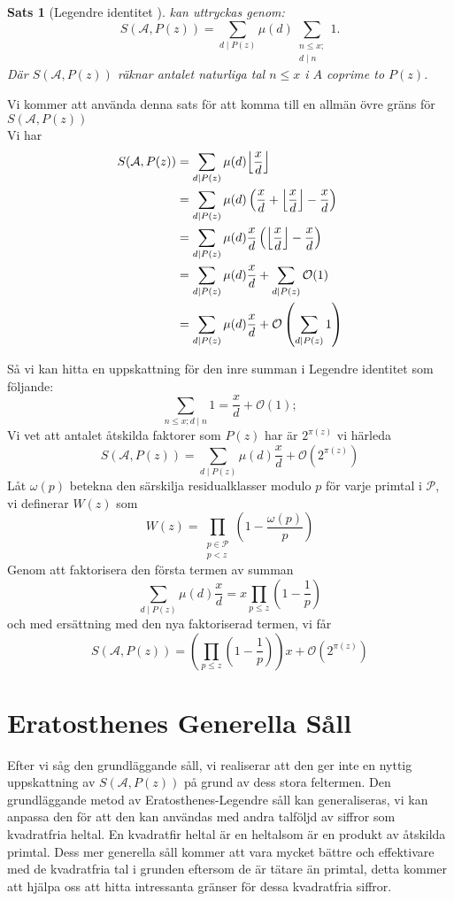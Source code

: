 \documentclass[12pt,a4paper]{article}
\newcommand{\divides}{\mid}
\newcommand{\A}{\mathcal{A}}
\renewcommand{\P}{\mathcal{P}}
\newtheorem{theorem}{Sats}[section]
\begin{document}
\begin{theorem}[Legendre identitet \cite{Terence}] kan uttryckas genom:
\[S(\A, P(z))=\sum_{d\divides P(z)}\mu(d)\sum_{\substack{n\leq x;\\d\divides n}}1. \]
Där  $ S(\A, P(z)) $ räknar antalet naturliga tal $ n\leq x $ i $ A $ coprime to $ P(z) $.
\end{theorem}
Vi kommer att använda denna sats för att komma till en allmän övre gräns för $ S(\A, P(z)) $\\
Vi har
\begin{align*}
S(\A, P(z)) & =\sum_{d\divides P(z)}\mu(d)\Bigl\lfloor \frac{x}{d}\Bigr\rfloor\\
 &  =\sum_{d\divides P(z)}\mu(d) \left( \frac{x}{d}+ \Bigl\lfloor \frac{x}{d} \Bigr\rfloor - \frac{x}{d} \right)\\
 & =\sum_{d\divides P(z)}\mu(d)\frac{x}{d} \left(\Bigl\lfloor\frac{x}{d}\Bigr\rfloor-\frac{x}{d}\right)\\
 & =\sum_{d\divides P(z)}\mu(d)\frac{x}{d}+\sum_{d\divides P(z)}\mathcal{O}(1)\\
 & =\sum_{d\divides P(z)}\mu(d)\frac{x}{d}+ \mathcal{O}\left(\sum_{d\divides P(z)}1\right)
\end{align*}

Så vi kan hitta en uppskattning för den inre summan i Legendre identitet som följande:
\[\sum_{n\leq x;d\divides n}1=\frac{x}{d}+\mathcal{O}(1); \]
Vi vet att antalet åtskilda faktorer som $ P(z) $ har är $ 2^{\pi(z)} $ vi härleda
\[S(\A, P(z))=\sum_{d\divides P(z)}\mu(d)\frac{x}{d}+ \mathcal{O}(2^{\pi(z)}) \]
Låt $ \omega(p) $ betekna den särskilja residualklasser modulo $ p $  för varje primtal i $ \P $, vi definerar $ W(z) $ som
\[W(z)=\prod_{\substack{p\in \P\\p<z}}\left( 1-\frac{\omega(p)}{p}\right)\]
Genom att faktorisera den första termen av summan 
\[\sum_{d\divides P(z)}\mu(d)\frac{x}{d}= x\prod_{p\leq z}\left( 1-\frac{1}{p} \right) \]
och med ersättning med den nya faktoriserad termen, vi får
\[S(\A, P(z))=\left( \prod_{p\leq z}\left( 1-\frac{1}{p} \right)\right) x +\mathcal{O}(2^{\pi(z)}) \]




\section{Eratosthenes Generella Såll}
Efter vi såg den grundläggande såll, vi realiserar att den ger inte en nyttig uppskattning av $ S(\A, P(z)) $ på grund av dess stora feltermen. Den grundläggande metod av Eratosthenes-Legendre såll kan generaliseras, vi kan anpassa den för att den kan användas med andra talföljd av siffror som kvadratfria heltal. En kvadratfir heltal är en heltalsom är en produkt av åtskilda primtal. Dess mer generella såll kommer att vara mycket bättre och effektivare med de kvadratfria tal i grunden eftersom de är tätare än primtal, detta kommer att hjälpa oss att hitta intressanta gränser för dessa kvadratfria siffror.
\end{document}
